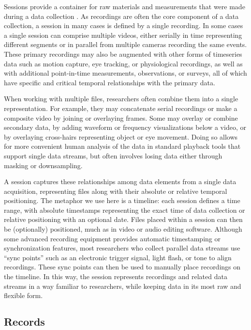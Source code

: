\documentclass{sig-alternate}
\begin{document}
Sessions provide a container for raw materials and measurements that were made during a data collection \cite{Bakeman_2012}.
As recordings are often the core component of a data collection, a session in many cases is defined by a single recording.
In some cases a single session can comprise multiple videos, either serially in time representing different segments or in parallel from multiple cameras recording the same events.
These primary recordings may also be augmented with other forms of timeseries data such as motion capture, eye tracking, or physiological recordings, as well as with additional point-in-time measurements, observations, or surveys, all of which have specific and critical temporal relationships with the primary data.

When working with multiple files, researchers often combine them into a single representation.
For example, they may concatenate serial recordings or make a composite video by joining or overlaying frames.
Some may overlay or combine secondary data, by adding waveform or frequency visualizations below a video, or by overlaying cross-hairs representing object or eye movement.
Doing so allows for more convenient human analysis of the data in standard playback tools that support single data streams, but often involves losing data either through masking or downsampling.

A session captures these relationships among data elements from a single data acquisition, representing files along with their absolute or relative temporal positioning.
The metaphor we use here is a timeline: each session defines a time range, with absolute timestamps representing the exact time of data collection or relative positioning with an optional date.
Files placed within a session can then be (optionally) positioned, much as in video or audio editing software.
Although some advanced recording equipment provides automatic timestamping or synchronization features, most researchers who collect parallel data streams use ``sync points'' such as an electronic trigger signal, light flash, or tone to align recordings.
These sync points can then be used to manually place recordings on the timeline.
In this way, the session represents recordings and related data streams in a way familiar to researchers, while keeping data in its most raw and flexible form.

\subsection{Records}
\end{document}

